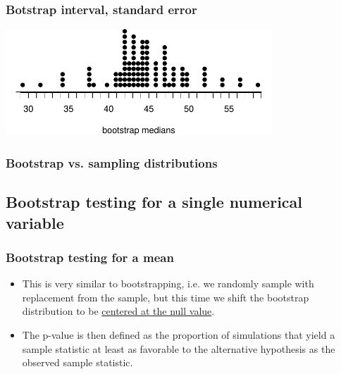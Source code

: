 \documentclass[11pt,containsverbatim,handout,xcolor=xelatex,dvipsnames,table]{beamer}
\newcommand{\soln}[1]{}
\begin{document}
\begin{frame}
\frametitle{Botstrap interval, standard error}


\begin{center}
\includegraphics[width = 0.75\textwidth]{figures/movies/horror_boot_med_dot}
\end{center}

\pause

\soln{\[ 43.5 \pm (1.65 \times 4.88) = (35.45, 51.55) \] }

\end{frame}


\begin{frame}
\frametitle{Bootstrap vs. sampling distributions}

\vfill


\vfill

\end{frame}


\subsection{Bootstrap testing for a single numerical variable}


\begin{frame}
\frametitle{Bootstrap testing for a mean}

\begin{itemize}

\item This is very similar to bootstrapping, i.e. we randomly sample with replacement from the sample, but this time we shift the bootstrap distribution to be \underline{centered at the null value}. 

\pause

\item The p-value is then defined as the proportion of simulations that yield a sample statistic at least as favorable to the alternative hypothesis as the observed sample statistic.

\end{itemize}

\end{frame}
\end{document}
